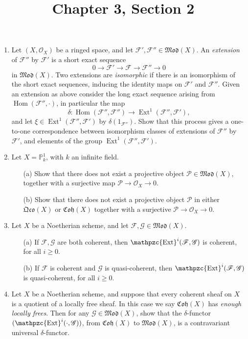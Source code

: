 \documentclass{article}
\title{Chapter 3, Section 2}
\newcommand{\goth}[1]{\mathfrak{#1}}
\newcommand{\fF}{\mathscr{F}}
\newcommand{\fG}{\mathscr{G}}
\newcommand{\fO}{\mathscr{O}}
\newcommand{\fP}{\mathscr{P}}
\newcommand{\PP}{\mathbb{P}}
\DeclareMathOperator{\Hom}{Hom}
\DeclareMathOperator{\Ext}{Ext}
\DeclareMathOperator{\rExt}{\mathpzc{Ext}}
\begin{document}
\maketitle
\begin{enumerate} [label=\textbf{\arabic*.}, leftmargin=0em]

\item Let $(X, \fO_X)$ be a ringed space, and let $\fF', \fF'' \in \goth{Mod}(X)$. An \textit{extension} of $\fF''$ by $\fF'$ is a short exact sequence
\begin{equation*}
  0 \to \fF' \to \fF \to \fF'' \to 0
\end{equation*}
in $\goth{Mod}(X)$. Two extensions are \textit{isomorphic} if there is an isomorphism of the short exact sequences, inducing the identity maps on $\fF'$ and $\fF''$. Given an extension as above consider the long exact sequence arising from $\Hom(\fF'', \cdot)$, in particular the map
\begin{equation*}
  \delta : \Hom(\fF'', \fF'') \to \Ext^1(\fF'', \fF'),
\end{equation*}
and let $\xi \in \Ext^1(\fF'', \fF')$ by $\delta(1_{\fF''})$. Show that this process gives a one-to-one correspondence between isomorphism classes of extensions of $\fF''$ by $\fF'$, and elements of the group $\Ext^1(\fF'', \fF')$.

\item Let $X = \PP_k^1$, with $k$ an infinite field.
\begin{itemize}
  \item[(a)] Show that there does not exist a projective object $\fP \in \goth{Mod}(X)$, together with a surjective map $\fP \to \fO_X \to 0$.
  \item[(b)] Show that there does not exist a projective object $\fP$ in either $\goth{Qco}(X)$ or $\goth{Coh}(X)$ together with a surjective $\fP \to \fO_X \to 0$.
\end{itemize}

\item Let $X$ be a Noetherian scheme, and let $\fF, \fG \in \goth{Mod}(X)$.
\begin{itemize}
  \item[(a)] If $\fF, \fG$ are both coherent, then $\rExt^i(\fF, \fG)$ is coherent, for all $i \geq 0$.
  \item[(b)] If $\fF$ is coherent and $\fG$ is quasi-coherent, then $\rExt^i(\fF, \fG)$ is quasi-coherent, for all $i \geq 0$.
\end{itemize}

\item Let $X$ be a Noetherian scheme, and suppose that every coherent sheaf on $X$ is a quotient of a locally free sheaf. In this case we say $\goth{Coh}(X)$ has \textit{enough locally frees}. Then for any $\fG \in \goth{Mod}(X)$, show that the $\delta$-functor $(\rExt^i(\cdot, \fG))$, from $\goth{Coh}(X)$ to $\goth{Mod}(X)$, is a contravariant universal $\delta$-functor.


\end{enumerate}
\end{document}
